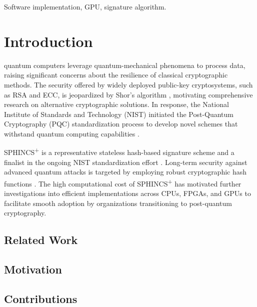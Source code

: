 \documentclass[journal]{IEEEtran}
\begin{document}
\begin{IEEEkeywords}
  Software implementation, GPU, signature algorithm.
\end{IEEEkeywords}

\section{Introduction}
\label{sec:intro}




 quantum computers leverage quantum-mechanical phenomena to process data, raising significant concerns about the resilience of classical cryptographic methods.
The security offered by widely deployed public-key cryptosystems, such as RSA and ECC, is jeopardized by Shor's algorithm \cite{Shor1994}, motivating comprehensive research on alternative cryptographic solutions. In response, the National Institute of Standards and Technology (NIST) initiated the Post-Quantum Cryptography (PQC) standardization process to develop novel schemes that withstand quantum computing capabilities \cite{NIST2016}.

SPHINCS\textsuperscript{+} is a representative stateless hash-based signature scheme and a finalist in the ongoing NIST standardization effort \cite{Turan}. Long-term security against advanced quantum attacks is targeted by employing robust cryptographic hash functions \cite{Bernstein2019}. The high computational cost of SPHINCS\textsuperscript{+} has motivated further investigations into efficient implementations across CPUs, FPGAs, and GPUs \cite{Joseph2022} to facilitate smooth adoption by organizations transitioning to post-quantum cryptography.

\subsection{Related Work}

\subsection{Motivation}

\subsection{Contributions}
\end{document}
